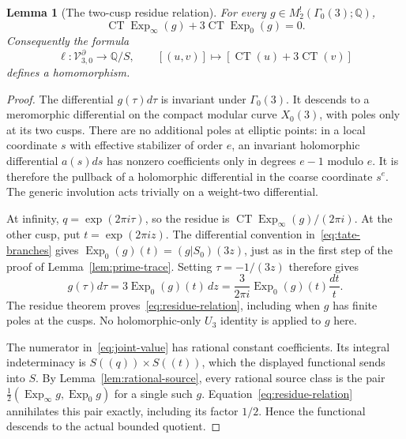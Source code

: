 \documentclass[11pt,a4paper]{amsart}
\newcommand{\Q}{\mathbb Q}
\newcommand{\Exp}{\operatorname{Exp}}
\newcommand{\cV}{\mathcal V}
\theoremstyle{plain}
\newtheorem{lemma}[theorem]{Lemma}
\theoremstyle{definition}
\theoremstyle{remark}
\begin{document}
\begin{lemma}[The two-cusp residue relation]\label{lem:residue-relation}
For every $g\in M_2^!(\Gamma_0(3);\Q)$,
\begin{equation}\label{eq:residue-relation}
 \operatorname{CT}\Exp_\infty(g)
       +3\operatorname{CT}\Exp_0(g)=0.
\end{equation}
Consequently the formula
\begin{equation}\label{eq:residue-detector}
 \ell:\cV_{3,0}^\partial\longrightarrow\Q/S,
 \qquad [(u,v)]\longmapsto
   [\operatorname{CT}(u)+3\operatorname{CT}(v)]
\end{equation}
defines a homomorphism.
\end{lemma}
\begin{proof}
The differential $g(\tau)d\tau$ is invariant under $\Gamma_0(3)$.
It descends to a meromorphic differential on the compact modular
curve $X_0(3)$, with poles only at its two cusps. There are no
additional poles at elliptic points: in a local coordinate $s$
with effective stabilizer of order $e$, an invariant holomorphic
differential $a(s)ds$ has nonzero coefficients only in degrees
$e-1$ modulo $e$. It is therefore the pullback of a holomorphic
differential in the coarse coordinate $s^e$. The generic
involution acts trivially on a weight-two differential.

At infinity, $q=\exp(2\pi i\tau)$, so the residue is
$\operatorname{CT}\Exp_\infty(g)/(2\pi i)$.
At the other cusp, put $t=\exp(2\pi iz)$.
The differential convention in~\eqref{eq:tate-branches} gives
$\Exp_0(g)(t)=(g|S_0)(3z)$, just as in the first step of the
proof of Lemma~\ref{lem:prime-trace}. Setting $\tau=-1/(3z)$
therefore gives
\[
 g(\tau)d\tau=3\Exp_0(g)(t)\,dz
             =\frac3{2\pi i}\Exp_0(g)(t)\frac{dt}{t}.
\]
The residue theorem proves~\eqref{eq:residue-relation}, including
when $g$ has finite poles at the cusps. No holomorphic-only
$U_3$ identity is applied to $g$ here.

The numerator in~\eqref{eq:joint-value} has rational constant
coefficients. Its integral indeterminacy is
$S((q))\times S((t))$, which the displayed functional sends into
$S$. By Lemma~\ref{lem:rational-source}, every rational source
class is the pair
$\tfrac12(\Exp_\infty g,\Exp_0 g)$ for a single such $g$.
Equation~\eqref{eq:residue-relation} annihilates this pair exactly,
including its factor $1/2$. Hence the functional descends to the
actual bounded quotient.
\end{proof}
\end{document}
